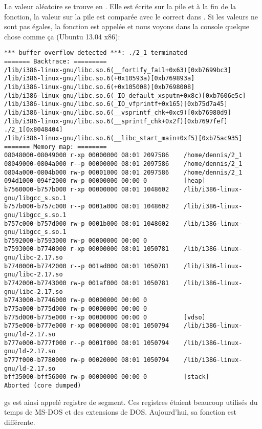 

La valeur aléatoire se trouve en .
Elle est écrite sur la pile et à la fin de la fonction, la valeur sur la pile est
comparée avec le  correct dans .
Si les valeurs ne sont pas égales, la fonction  est appelée
et nous voyons dans la console quelque chose comme ça (Ubuntu 13.04 x86):

\begin{lstlisting}
*** buffer overflow detected ***: ./2_1 terminated
======= Backtrace: =========
/lib/i386-linux-gnu/libc.so.6(__fortify_fail+0x63)[0xb7699bc3]
/lib/i386-linux-gnu/libc.so.6(+0x10593a)[0xb769893a]
/lib/i386-linux-gnu/libc.so.6(+0x105008)[0xb7698008]
/lib/i386-linux-gnu/libc.so.6(_IO_default_xsputn+0x8c)[0xb7606e5c]
/lib/i386-linux-gnu/libc.so.6(_IO_vfprintf+0x165)[0xb75d7a45]
/lib/i386-linux-gnu/libc.so.6(__vsprintf_chk+0xc9)[0xb76980d9]
/lib/i386-linux-gnu/libc.so.6(__sprintf_chk+0x2f)[0xb7697fef]
./2_1[0x8048404]
/lib/i386-linux-gnu/libc.so.6(__libc_start_main+0xf5)[0xb75ac935]
======= Memory map: ========
08048000-08049000 r-xp 00000000 08:01 2097586    /home/dennis/2_1
08049000-0804a000 r--p 00000000 08:01 2097586    /home/dennis/2_1
0804a000-0804b000 rw-p 00001000 08:01 2097586    /home/dennis/2_1
094d1000-094f2000 rw-p 00000000 00:00 0          [heap]
b7560000-b757b000 r-xp 00000000 08:01 1048602    /lib/i386-linux-gnu/libgcc_s.so.1
b757b000-b757c000 r--p 0001a000 08:01 1048602    /lib/i386-linux-gnu/libgcc_s.so.1
b757c000-b757d000 rw-p 0001b000 08:01 1048602    /lib/i386-linux-gnu/libgcc_s.so.1
b7592000-b7593000 rw-p 00000000 00:00 0
b7593000-b7740000 r-xp 00000000 08:01 1050781    /lib/i386-linux-gnu/libc-2.17.so
b7740000-b7742000 r--p 001ad000 08:01 1050781    /lib/i386-linux-gnu/libc-2.17.so
b7742000-b7743000 rw-p 001af000 08:01 1050781    /lib/i386-linux-gnu/libc-2.17.so
b7743000-b7746000 rw-p 00000000 00:00 0
b775a000-b775d000 rw-p 00000000 00:00 0
b775d000-b775e000 r-xp 00000000 00:00 0          [vdso]
b775e000-b777e000 r-xp 00000000 08:01 1050794    /lib/i386-linux-gnu/ld-2.17.so
b777e000-b777f000 r--p 0001f000 08:01 1050794    /lib/i386-linux-gnu/ld-2.17.so
b777f000-b7780000 rw-p 00020000 08:01 1050794    /lib/i386-linux-gnu/ld-2.17.so
bff35000-bff56000 rw-p 00000000 00:00 0          [stack]
Aborted (core dumped)
\end{lstlisting}

gs est ainsi appelé registre de segment. Ces registres étaient beaucoup utilisés
du temps de MS-DOS et des extensions de DOS.
Aujourd'hui, sa fonction est différente.

